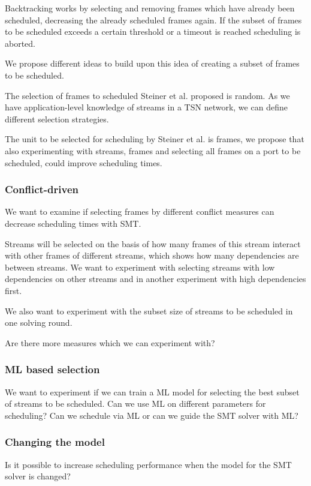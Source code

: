 \documentclass[conference]{IEEEtran}
\begin{document}
Backtracking works by selecting and removing frames which have already been scheduled, decreasing the already scheduled frames again. If the subset of frames to be scheduled exceeds a certain threshold or a timeout is reached scheduling is aborted.

We propose different ideas to build upon this idea of creating a subset of frames to be scheduled.

The selection of frames to scheduled Steiner et al. proposed is random. As we have application-level knowledge of streams in a TSN network, we can define different selection strategies.

The unit to be selected for scheduling by Steiner et al. is frames, we propose that also experimenting with streams, frames and selecting all frames on a port to be scheduled, could improve scheduling times.

\subsubsection{Conflict-driven}
We want to examine if selecting frames by different conflict measures can decrease scheduling times with SMT.

Streams will be selected on the basis of how many frames of this stream interact with other frames of different streams, which shows how many dependencies are between streams. We want to experiment with selecting streams with low dependencies on other streams and in another experiment with high dependencies first.

We also want to experiment with the subset size of streams to be scheduled in one solving round.

Are there more measures which we can experiment with?

\subsubsection{ML based selection}
We want to experiment if we can train a ML model for selecting the best subset of streams to be scheduled. Can we use ML on different parameters for scheduling? Can we schedule via ML or can we guide the SMT solver with ML?

\subsubsection{Changing the model}
Is it possible to increase scheduling performance when the model for the SMT solver is changed?
\end{document}
